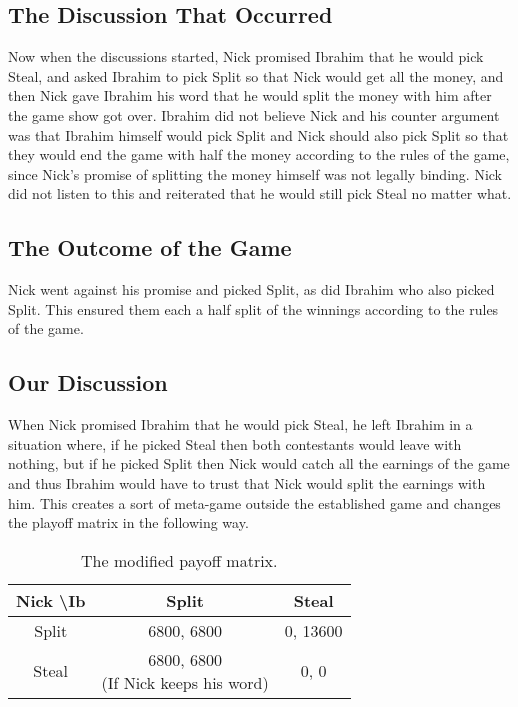 \documentclass[11pt]{article}
\theoremstyle{definition}
\begin{document}
\subsection{The Discussion That Occurred}
Now when the discussions started, Nick promised Ibrahim that he would pick Steal, and asked Ibrahim to pick Split so that Nick would get all the money, and then Nick gave Ibrahim his word that he would split the money with him after the game show got over. Ibrahim did not believe Nick and his counter argument was that Ibrahim himself would pick Split and Nick should also pick Split so that they would end the game with half the money according to the rules of the game, since Nick’s promise of splitting the money himself was not legally binding. Nick did not listen to this and reiterated that he would still pick Steal no matter what. 

\subsection{The Outcome of the Game}
Nick went against his promise and picked Split, as did Ibrahim who also picked Split. This ensured them each a half split of the winnings according to the rules of the game.

\subsection{Our Discussion}
When Nick promised Ibrahim that he would pick Steal, he left Ibrahim in a situation where, if he picked Steal then both contestants would leave with nothing, but if he picked Split then Nick would catch all the earnings of the game and thus Ibrahim would have to trust that Nick would split the earnings with him. This creates a sort of meta-game outside the established game and changes the playoff matrix in the following way.

\begin{table}[h!]
\centering
\begin{tabular}{|c|c|c|}
\hline
Nick \textbackslash Ib & Split & Steal \\
\hline
Split & 6800, 6800 & 0, 13600 \\
\hline
Steal & \shortstack{6800, 6800 \\ \small{(If Nick keeps his word)}} & 0, 0 \\
\hline
\end{tabular}
\caption{The modified payoff matrix.}
\label{table:ss1}
\end{table}
\end{document}
